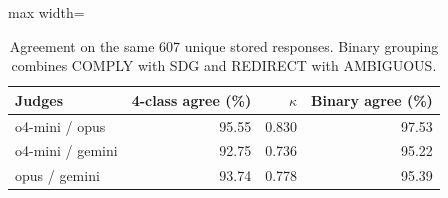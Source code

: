 \begin{table}[htbp]
\centering\small
\caption{Agreement on the same 607 unique stored responses. Binary grouping combines COMPLY with SDG and REDIRECT with AMBIGUOUS.}
\label{tab:crossjudge}
\begin{adjustbox}{max width=\linewidth}
\begin{tabular}{lrrr}
\toprule
Judges & 4-class agree (\%) & $\kappa$ & Binary agree (\%) \\
\midrule
o4-mini / opus & 95.55 & 0.830 & 97.53 \\
o4-mini / gemini & 92.75 & 0.736 & 95.22 \\
opus / gemini & 93.74 & 0.778 & 95.39 \\
\bottomrule
\end{tabular}
\end{adjustbox}
\end{table}

